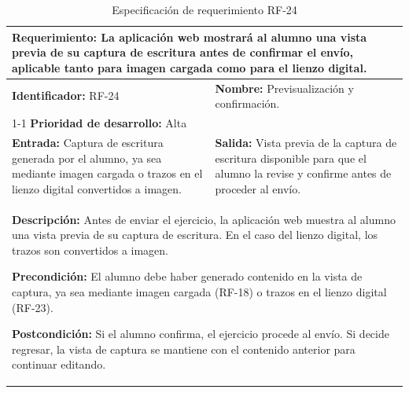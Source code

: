 \begin{table}[H]
\caption{Especificación de requerimiento RF-24}
\centering
\renewcommand{\arraystretch}{1.3}
\setlength{\tabcolsep}{6pt}
\begin{tabular}{|p{7cm}|p{8cm}|}
\hline
\multicolumn{2}{|p{15cm}|}{\textbf{Requerimiento:} La aplicación web mostrará al alumno una vista previa de su captura de escritura antes de confirmar el envío, aplicable tanto para imagen cargada como para el lienzo digital.} \\ \hline
\textbf{Identificador:} RF-24 &
\textbf{Nombre:} Previsualización y confirmación. \\ \cline{1-1}
\textbf{Prioridad de desarrollo:} Alta &
\multicolumn{1}{p{8cm}|}{} \\ \hline
\textbf{Entrada:} Captura de escritura generada por el alumno, ya sea mediante imagen cargada o trazos en el lienzo digital convertidos a imagen. &
\textbf{Salida:} Vista previa de la captura de escritura disponible para que el alumno la revise y confirme antes de proceder al envío. \\ \hline
\multicolumn{2}{|p{15cm}|}{
\textbf{Descripción:} Antes de enviar el ejercicio, la aplicación web muestra al alumno una vista previa de su captura de escritura. En el caso del lienzo digital, los trazos son convertidos a imagen. 

\vspace{0.2cm}
\textbf{Precondición:} El alumno debe haber generado contenido en la vista de captura, ya sea mediante imagen cargada (RF-18) o trazos en el lienzo digital (RF-23).

\vspace{0.2cm}
\textbf{Postcondición:} Si el alumno confirma, el ejercicio procede al envío. Si decide regresar, la vista de captura se mantiene con el contenido anterior para continuar editando.
} \\ \hline
\end{tabular}
\label{tab:rf24}
\end{table}

